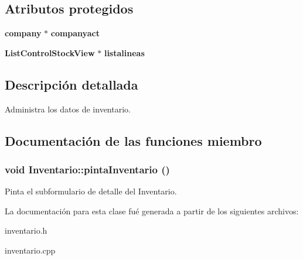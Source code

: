 \subsection*{Atributos protegidos}
\begin{CompactItemize}
\item 
{\bf company} $\ast$ {\bf companyact}\label{classInventario_p0}

\item 
{\bf List\-Control\-Stock\-View} $\ast$ {\bf listalineas}\label{classInventario_p1}

\end{CompactItemize}


\subsection{Descripci\'{o}n detallada}
Administra los datos de inventario. 



\subsection{Documentaci\'{o}n de las funciones miembro}
\subsubsection{\setlength{\rightskip}{0pt plus 5cm}void Inventario::pinta\-Inventario ()}\label{classInventario_a8}


Pinta el subformulario de detalle del Inventario. 

La documentaci\'{o}n para esta clase fu\'{e} generada a partir de los siguientes archivos:\begin{CompactItemize}
\item 
inventario.h\item 
inventario.cpp\end{CompactItemize}
